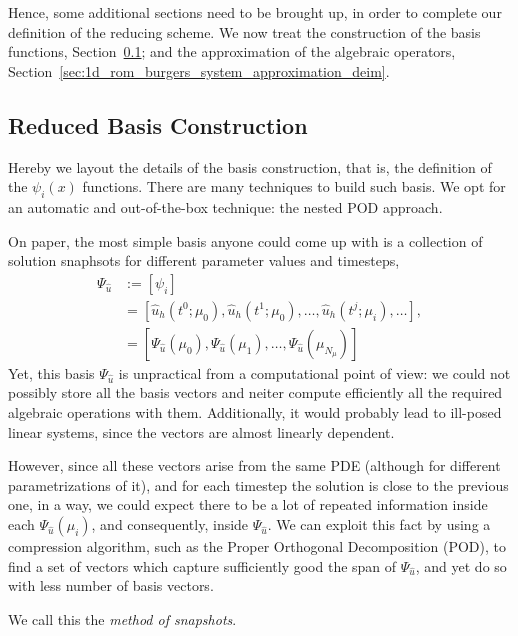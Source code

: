 \documentclass[../../thesis.tex]{subfiles}
\begin{document}
Hence, some additional sections need to be brought up, in order to complete our definition of the reducing scheme.
We now treat the construction of the basis functions, Section~\ref{sec:1d_rom_burgers_basis_construction}; and the approximation of the algebraic operators, Section~\ref{sec:1d_rom_burgers_system_approximation_deim}.

\subsection{Reduced Basis Construction}
\label{sec:1d_rom_burgers_basis_construction}
Hereby we layout the details of the basis construction, that is, the definition of the $\psi_i(x)$ functions.
There are many techniques to build such basis.
We opt for an automatic and out-of-the-box technique: the nested POD approach. 

On paper, the most simple basis anyone could come up with is a collection of solution snaphsots for different parameter values and timesteps, 
\begin{align}
    \Psi_{\hat{u}} &:= [\psi_i] \nonumber \\
    &= [\hat{u}_h(t^0; \mu_0), \hat{u}_h(t^1; \mu_0), 
    \ldots, \hat{u}_h(t^j; \mu_i), \ldots], \nonumber \\
    &= [\Psi_{\hat{u}}(\mu_0), \Psi_{\hat{u}}(\mu_1), \ldots, \Psi_{\hat{u}}(\mu_{N_{\mu}})]
\end{align}
Yet, this basis $\Psi_{\hat{u}}$ is unpractical from a computational point of view: we could not possibly store all the basis vectors and neiter compute efficiently all the required algebraic operations with them.
Additionally, it would probably lead to ill-posed linear systems, since the vectors are almost linearly dependent. 

However, since all these vectors arise from the same PDE (although for different parametrizations of it), and for each timestep the solution is close to the previous one, in a way, we could expect there to be a lot of repeated information inside each $\Psi_{\hat{u}}(\mu_i)$, and consequently, inside $\Psi_{\hat{u}}$.
We can exploit this fact by using a compression algorithm, such as the Proper Orthogonal Decomposition (POD), to find a set of vectors which capture sufficiently good the span of $\Psi_{\hat{u}}$, and yet do so with less number of basis vectors. 

We call this the \emph{method of snapshots}. 
\end{document}
